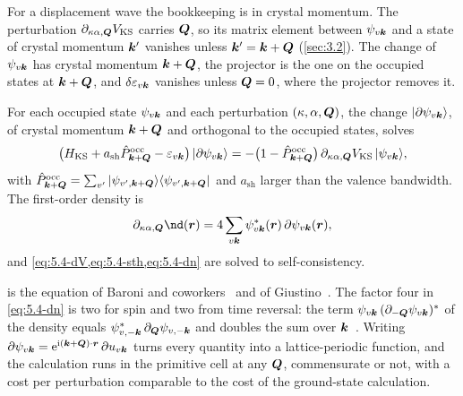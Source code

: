For a displacement wave the bookkeeping is in crystal momentum. The perturbation $\partial_{\kappa\alpha,\bm{Q}}V_{\mathrm{KS}}$ carries $\bm{Q}$, so its matrix element between $\psi_{v\bm{k}}$ and a state of crystal momentum $\bm{k}'$ vanishes unless $\bm{k}' = \bm{k} + \bm{Q}$ (\cref{sec:3.2}). The change of $\psi_{v\bm{k}}$ has crystal momentum $\bm{k} + \bm{Q}$, the projector is the one on the occupied states at $\bm{k}+\bm{Q}$, and $\delta\varepsilon_{v\bm{k}}$ vanishes unless $\bm{Q} = 0$, where the projector removes it.
\begin{keyresult}
For each occupied state $\psi_{v\bm{k}}$ and each perturbation $(\kappa,\alpha,\bm{Q})$, the change $|\partial\psi_{v\bm{k}}\rangle$, of crystal momentum $\bm{k}+\bm{Q}$ and orthogonal to the occupied states, solves
\begin{equation}
  \bigl(H_{\mathrm{KS}} + a_{\mathrm{sh}}\hat{P}^{\mathrm{occ}}_{\bm{k}+\bm{Q}} - \varepsilon_{v\bm{k}}\bigr)\,|\partial\psi_{v\bm{k}}\rangle
  = -\bigl(1 - \hat{P}^{\mathrm{occ}}_{\bm{k}+\bm{Q}}\bigr)\,\partial_{\kappa\alpha,\bm{Q}}V_{\mathrm{KS}}\,|\psi_{v\bm{k}}\rangle ,
  \label{eq:5.4-sth}
\end{equation}
with $\hat{P}^{\mathrm{occ}}_{\bm{k}+\bm{Q}} = \sum_{v'}|\psi_{v',\bm{k}+\bm{Q}}\rangle\langle\psi_{v',\bm{k}+\bm{Q}}|$ and $a_{\mathrm{sh}}$ larger than the valence bandwidth. The first-order density is
\begin{equation}
  \partial_{\kappa\alpha,\vect{Q}}\nd(\vect{r}) = 4\sum_{v\vect{k}}\psi^*_{v\vect{k}}(\vect{r})\,\partial\psi_{v\vect{k}}(\vect{r}) ,
  \label{eq:5.4-dn}
\end{equation}
and \cref{eq:5.4-dV,eq:5.4-sth,eq:5.4-dn} are solved to self-consistency.
\end{keyresult}
 is the equation of Baroni and coworkers~\cite[Eq.~(31)]{baroni2001phonons} and of Giustino~\cite[Eq.~(48)]{giustino2017electron}. The factor four in \cref{eq:5.4-dn} is two for spin and two from time reversal: the term $\psi_{v\bm{k}}\,(\partial_{-\bm{Q}}\psi_{v\bm{k}})^*$ of the density equals $\psi^*_{v,-\bm{k}}\,\partial_{\bm{Q}}\psi_{v,-\bm{k}}$ and doubles the sum over $\bm{k}$~\cite[Eq.~(35)]{baroni2001phonons}. Writing $\partial\psi_{v\bm{k}} = \mathrm{e}^{\mathrm{i}(\bm{k}+\bm{Q})\cdot\bm{r}}\,\partial u_{v\bm{k}}$ turns every quantity into a lattice-periodic function, and the calculation runs in the primitive cell at any $\bm{Q}$, commensurate or not, with a cost per perturbation comparable to the cost of the ground-state calculation.

